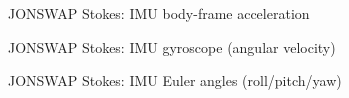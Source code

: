 \documentclass[11pt,letterpaper]{article}
\begin{document}
\begin{figure}[H]\centering
  \resizebox{\textwidth}{!}{}
  \caption{JONSWAP Stokes: IMU body-frame acceleration}
  \label{fig:jonswap_imu_acc}
\end{figure}
\clearpage

\begin{figure}[H]\centering
  \resizebox{\textwidth}{!}{}
  \caption{JONSWAP Stokes: IMU gyroscope (angular velocity)}
  \label{fig:jonswap_imu_gyro}
\end{figure}
\clearpage

\begin{figure}[H]\centering
  \resizebox{\textwidth}{!}{}
  \caption{JONSWAP Stokes: IMU Euler angles (roll/pitch/yaw)}
  \label{fig:jonswap_euler}
\end{figure}
\clearpage
\end{document}
